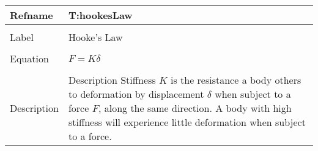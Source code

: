 \documentclass[12pt]{article}
\begin{document}
~\newline
\noindent \begin{minipage}{\textwidth}
\begin{tabular}{p{} p{}}
\toprule \textbf{Refname} & \textbf{T:hookesLaw}
\label{T:hookesLaw}
\\ \midrule \\
Label & Hooke's Law
\\ \midrule \\
Equation & $F=K δ$
\\ \midrule \\
Description & Description Stiffness $K$ is the resistance a body others to deformation by displacement $δ$ when subject to a force $F$, along the same direction. A body with high stiffness will experience little deformation when subject to a force.
\\ \bottomrule \end{tabular}
\end{minipage}\\
\end{document}
